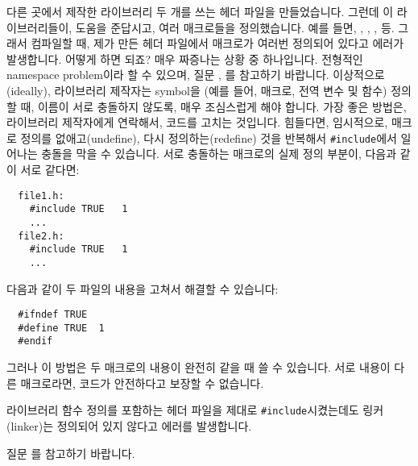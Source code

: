 \begin{faq} 
	다른 곳에서 제작한 라이브러리 두 개를 쓰는 헤더 파일을 만들었습니다.
        그런데 이 라이브러리들이, 도움을 준답시고, 여러 매크로들을 정의했습니다.
        예를 들면, , , ,  등.
        그래서 컴파일할 때, 제가 만든 헤더 파일에서 매크로가 여러번 
        정의되어 있다고 에러가 발생합니다. 어떻게 하면 되죠?
\A
	매우 짜증나는 상황 중 하나입니다. 전형적인 namespace problem이라
        할 수 있으며, 질문 , 를 참고하기 바랍니다.
        이상적으로(ideally), 라이브러리 제작자는 symbol을 (예를 들어,
        매크로, 전역 변수 및 함수) 정의할 때, 이름이 서로 충돌하지 않도록,
        매우 조심스럽게 해야 합니다. 가장 좋은 방법은, 라이브러리 제작자에게
        연락해서, 코드를 고치는 것입니다. 힘들다면, 임시적으로, 매크로 정의를
        없애고(undefine), 다시 정의하는(redefine) 것을 반복해서
        \verb+#include+에서 일어나는 충돌을 막을 수 있습니다.
\T
	서로 충돌하는 매크로의 실제 정의 부분이, 다음과 같이 서로 같다면:
\begin{verbatim}
  file1.h:
    #include TRUE	1
    ...
  file2.h:
    #include TRUE	1
    ...
\end{verbatim}
	\noindent 다음과 같이 두 파일의 내용을 고쳐서 해결할 수 있습니다:
\begin{verbatim}
  #ifndef TRUE
  #define TRUE	1
  #endif
\end{verbatim}
	\noindent 그러나 이 방법은 두 매크로의 내용이 완전히 같을 때 쓸 수
        있습니다. 서로 내용이 다른 매크로라면, 코드가 안전하다고 보장할 수
        없습니다.
\end{faq}

\begin{faq}
	라이브러리 함수 정의를 포함하는 헤더 파일을 제대로
	\verb+#include+시켰는데도 링커(linker)는 정의되어 있지 않다고
	에러를 발생합니다.

\A
	질문 를 참고하기 바랍니다.
\end{faq}

